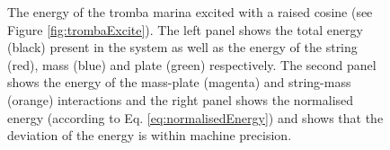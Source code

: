 \begin{figure}[h]
    \centering
      \caption{The energy of the tromba marina excited with a raised cosine (see Figure \ref{fig:trombaExcite}). The left panel shows the total energy (black) present in the system as well as the energy of the string (red), mass (blue) and plate (green) respectively. The second panel shows the energy of the mass-plate (magenta) and string-mass (orange) interactions and the right panel shows the normalised energy (according to Eq. \eqref{eq:normalisedEnergy}) and shows that the deviation of the energy is within machine precision. \label{fig:trombaEnergy}}
\end{figure}



